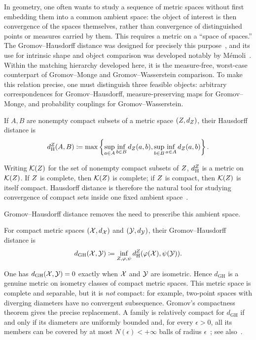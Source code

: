 In geometry, one often wants to study a sequence of metric spaces without first embedding them into a common ambient space: the object of interest is then convergence of the spaces themselves, rather than convergence of distinguished points or measures carried by them. This requires a metric on a ``space of spaces.'' The Gromov--Hausdorff distance was designed for precisely this purpose~\cite{gromov-2001,burago2001course}, and its use for intrinsic shape and object comparison was developed notably by M\'emoli~\cite{memoli-2007}. Within the matching hierarchy developed here, it is the measure-free, worst-case counterpart of Gromov--Monge and Gromov--Wasserstein comparison. To make this relation precise, one must distinguish three feasible objects: arbitrary correspondences for Gromov--Hausdorff, measure-preserving maps for Gromov--Monge, and probability couplings for Gromov--Wasserstein.

\begin{defn}\label{def-hausdorff-distance}
If $A,B$ are nonempty compact subsets of a metric space $(Z,d_Z)$, their Hausdorff distance is
\[
	d_{\mathrm H}^{Z}(A,B)
	\coloneqq
	\max\left\{
		\sup_{a\in A}\inf_{b\in B}d_Z(a,b),
		\sup_{b\in B}\inf_{a\in A}d_Z(a,b)
	\right\}.
\]
\end{defn}
Writing $\mathcal K(Z)$ for the set of nonempty compact subsets of $Z$, $d_{\mathrm H}^{Z}$ is a metric on $\mathcal K(Z)$. If $Z$ is complete, then $\mathcal K(Z)$ is complete; if $Z$ is compact, then $\mathcal K(Z)$ is itself compact. Hausdorff distance is therefore the natural tool for studying convergence of compact sets inside one fixed ambient space~\cite[Section~7.3]{burago2001course}.

Gromov--Hausdorff distance removes the need to prescribe this ambient space.
\begin{defn}\label{def-gromov-hausdorff-distance}
For compact metric spaces $(\mathcal{X},d_{\mathcal{X}})$ and $(\mathcal{Y},d_{\mathcal{Y}})$, their Gromov--Hausdorff distance is
\[
d_{\mathrm{GH}}(\mathcal{X},\mathcal{Y})
\coloneqq
\inf_{Z,\varphi,\psi}
d_{\mathrm H}^{Z}(\varphi(\mathcal{X}),\psi(\mathcal{Y})).
\]
\end{defn}
One has $d_{\mathrm{GH}}(\mathcal{X},\mathcal{Y})=0$ exactly when $\mathcal{X}$ and $\mathcal{Y}$ are isometric. Hence $d_{\mathrm{GH}}$ is a genuine metric on isometry classes of compact metric spaces. This metric space is complete and separable, but it is \emph{not} compact: for example, two-point spaces with diverging diameters have no convergent subsequence. Gromov's compactness theorem gives the precise replacement. A family is relatively compact for $d_{\mathrm{GH}}$ if and only if its diameters are uniformly bounded and, for every $\epsilon>0$, all its members can be covered by at most $N(\epsilon)<+\infty$ balls of radius $\epsilon$~\cite[Section~7.4]{burago2001course}; see also~\cite{gromov-2001,petersen1993gromov}.

